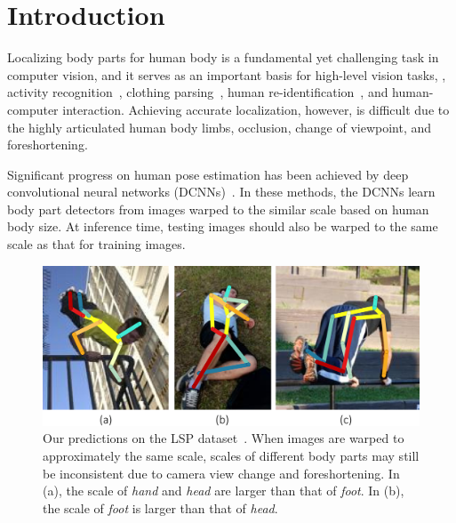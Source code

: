 \documentclass[10pt,twocolumn,letterpaper]{article}
\begin{document}

\section{Introduction}

Localizing body parts for human body is a fundamental yet challenging task in computer vision, and it serves as an important basis for high-level vision tasks, \eg, activity recognition~\cite{yang2010recognizing,wang2013pose}, clothing parsing~\cite{yamaguchi2012parsing,yang2014clothing,liu2015matching}, human re-identification~\cite{zheng2017pose}, and human-computer interaction.
Achieving accurate localization, however, is difficult due to the highly articulated human body limbs, occlusion,  change of viewpoint, and foreshortening.

Significant progress on human pose estimation has been achieved by deep convolutional neural networks (DCNNs)~\cite{toshev2014deeppose,tompson2014joint,chen2014articulated,tompson2015efficient,pishchulin2016deepcut,wei2016convolutional,newell2016stacked}.  
In these methods, the DCNNs learn body part detectors from images warped to the similar scale based on human body size.  
At inference time, testing images should also be warped to the same scale as that for training images. 



\begin{figure}[t]
	\begin{center}
		\includegraphics[width=1\linewidth]{figures/intro.pdf}
	\end{center}
	\vspace{-1em}
	\caption{Our predictions on the LSP dataset~\cite{Johnson10}. When images are warped to approximately the same scale, scales of different body parts may still be  inconsistent due to camera view change and foreshortening. In (a), the scale of \textit{hand} and \textit{head} are larger than that of \textit{foot}. In (b), the scale of \textit{foot} is larger than that of \textit{head}. }
	\label{fig:motivation}
	\vspace{-1em}
\end{figure}
\end{document}
